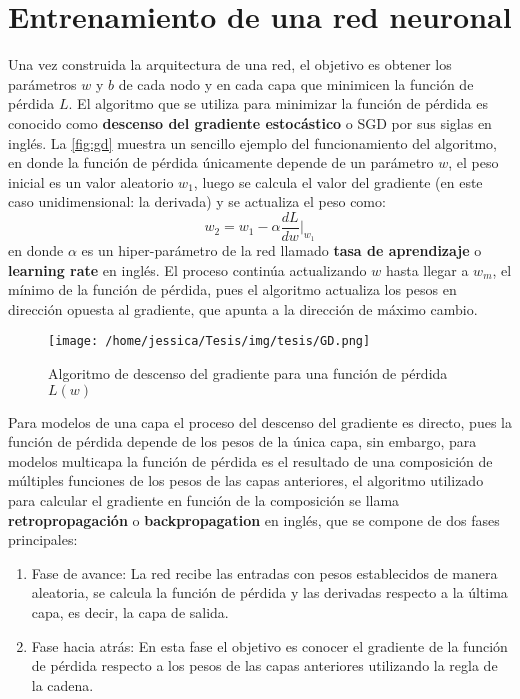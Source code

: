 \section{Entrenamiento de una red neuronal}\label{sec:TrainNN}
Una vez construida la arquitectura de una red, el objetivo es obtener los parámetros $w$ y $b$ de cada nodo y en cada capa que minimicen la función de pérdida $L$. El algoritmo que se utiliza para minimizar la función de pérdida es conocido como \textbf{descenso del gradiente estocástico} o SGD por sus siglas en inglés. La \autoref{fig:gd} muestra un sencillo ejemplo del funcionamiento del algoritmo, en donde la función de pérdida únicamente depende de un parámetro $w$, el peso inicial es un valor aleatorio $w_1$, luego se calcula el valor del gradiente (en este caso unidimensional: la derivada) y se actualiza el peso como:
$$w_2 = w_1 - \alpha \frac{dL}{dw}\bigg|_{w_1}$$
en donde $\alpha$ es un hiper-parámetro de la red llamado \textbf{tasa de aprendizaje} o \textbf{learning rate} en inglés. El proceso continúa actualizando $w$ hasta llegar a $w_m$, el mínimo de la función de pérdida, pues el algoritmo actualiza los pesos en dirección opuesta al gradiente, que apunta a la dirección de máximo cambio.

\begin{figure}[h]
  \centering
  \texttt{[image: /home/jessica/Tesis/img/tesis/GD.png]}
\caption{Algoritmo de descenso del gradiente para una función de pérdida $L(w)$}
\label{fig:gd}
\end{figure}

Para modelos de una capa el proceso del descenso del gradiente es directo, pues la función de pérdida depende de los pesos de la
única capa, sin embargo, para modelos multicapa la función de pérdida es el resultado de una composición de múltiples funciones de los pesos de las capas anteriores, el algoritmo utilizado para calcular el gradiente en función de la composición se llama \textbf{retropropagación} o \textbf{backpropagation} en inglés, que se compone de dos fases principales:
\begin{enumerate}
\item Fase de avance: La red recibe las entradas con pesos establecidos de manera aleatoria, se calcula la función de pérdida y las derivadas respecto a la última capa, es decir, la capa de salida.
  \item Fase hacia atrás: En esta fase el objetivo es conocer el gradiente de la función de pérdida respecto a los pesos de las capas anteriores utilizando la regla de la cadena.
\end{enumerate}


